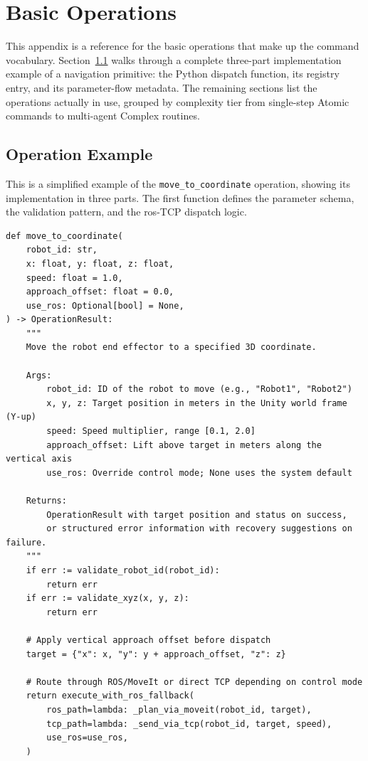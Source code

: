 \documentclass[
     12pt,
     a4paper,
     BCOR=10mm,
     DIV=14,
     listof=totoc,
     bibliography=totoc,
     parskip,
     twoside,
     headsepline
     ]{scrreprt}
\begin{document}
\chapter{Basic Operations}\label{appendix:basic_ops}
This appendix is a reference for the basic operations that make up the command vocabulary. Section~\ref{appendix:operation_example} walks through a complete three-part implementation example of a navigation primitive: the Python dispatch function, its registry entry, and its parameter-flow metadata. The remaining sections list the operations actually in use, grouped by complexity tier from single-step Atomic commands to multi-agent Complex routines.

\section{Operation Example}\label{appendix:operation_example}
This is a simplified example of the \texttt{move\_to\_coordinate} operation, showing its implementation in three parts. The first function defines the parameter schema, the validation pattern, and the \gls{ros}-TCP dispatch logic.

\begin{lstlisting}[caption={Python implementation function for coordinate navigation with ROS fallback and validation guards.}, extendedchars=true]
def move_to_coordinate(
    robot_id: str,
    x: float, y: float, z: float,
    speed: float = 1.0,
    approach_offset: float = 0.0,
    use_ros: Optional[bool] = None,
) -> OperationResult:
    """
    Move the robot end effector to a specified 3D coordinate.

    Args:
        robot_id: ID of the robot to move (e.g., "Robot1", "Robot2")
        x, y, z: Target position in meters in the Unity world frame (Y-up)
        speed: Speed multiplier, range [0.1, 2.0]
        approach_offset: Lift above target in meters along the vertical axis
        use_ros: Override control mode; None uses the system default

    Returns:
        OperationResult with target position and status on success,
        or structured error information with recovery suggestions on failure.
    """
    if err := validate_robot_id(robot_id):
        return err
    if err := validate_xyz(x, y, z):
        return err

    # Apply vertical approach offset before dispatch
    target = {"x": x, "y": y + approach_offset, "z": z}

    # Route through ROS/MoveIt or direct TCP depending on control mode
    return execute_with_ros_fallback(
        ros_path=lambda: _plan_via_moveit(robot_id, target),
        tcp_path=lambda: _send_via_tcp(robot_id, target, speed),
        use_ros=use_ros,
    )
\end{lstlisting}
\end{document}
